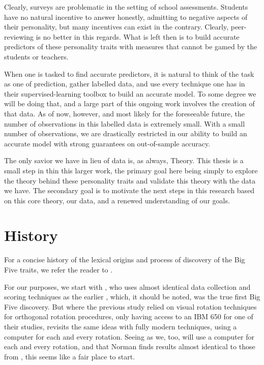 \documentclass[a4paper,12pt]{article}
\begin{document}
Clearly, surveys are problematic in the setting of school assessments. Students have no natural incentive to answer honestly, admitting to negative aspects of their personality, but many incentives can exist in the contrary. Clearly, peer-reviewing is no better in this regards. What is left then is to build accurate predictors of these personality traits with measures that cannot be gamed by the students or teachers.

When one is tasked to find accurate predictors, it is natural to think of the task as one of prediction, gather labelled data, and use every technique one has in their supervised-learning toolbox to build an accurate model. To some degree we will be doing that, and a large part of this ongoing work involves the creation of that data. As of now, however, and most likely for the foreseeable future, the number of observations in this labelled data is extremely small. With a small number of observations, we are drastically restricted in our ability to build an accurate model with strong guarantees on out-of-sample accuracy.

The only savior we have in lieu of data is, as always, Theory. This thesis is a small step in thin this larger work, the primary goal here being simply to explore the theory behind these personality traits and validate this theory with the data we have. The secondary goal is to motivate the next steps in this research based on this core theory, our data, and a renewed understanding of our goals.

\section{History}

For a concise history of the lexical origins and process of discovery of the Big Five traits, we refer the reader to \cite{john1999}.

For our purposes, we start with \cite{norman1963}, who uses almost identical data collection and scoring techniques as the earlier \cite{tupes1961}, which, it should be noted, was the true first Big Five discovery. But where the previous study relied on visual rotation techniques for orthogonal rotation procedures, only having access to an IBM 650 for one of their studies, \cite{norman1963} revisits the same ideas with fully modern techniques, using a computer for each and every rotation. Seeing as we, too, will use a computer for each and every rotation, and that Norman finds results almost identical to those from \cite{tupes1961}, this seems like a fair place to start.
\end{document}
